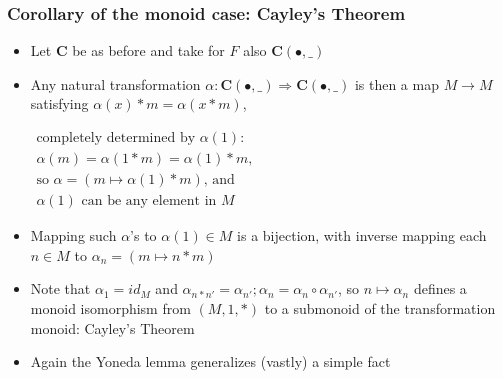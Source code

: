 \documentclass[handout]{beamer}
\newcommand{\To}{\Rightarrow}
\newcommand{\bfsf}[1]{{\boldsymbol{#1}}}
\newcommand{\CC}{\bfsf{C}}
\begin{document}
\frame
  {   
    \frametitle{Corollary of the monoid case: Cayley's Theorem}\label{Yon:MonCayley}

 \begin{itemize}[<+->]
\item Let $\CC$ be as before and take for $F$ also $\CC(\bullet,\_)$
\item Any natural transformation $\alpha: \CC(\bullet,\_)\To \CC(\bullet,\_)$ is
then a map $M\to M$ satisfying $\alpha(x)*m = \alpha(x*m)$,
$\begin{array}{l}%
\text{completely determined by $\alpha(1)$:}\\
\text{$\alpha(m) = \alpha(1*m)   = \alpha(1)*m$,}\\
\text{so $\alpha = (m\mapsto \alpha(1)*m)$, and}\\ %
\text{$\alpha(1)$ can be any element in $M$}
\end{array}$
\item Mapping such $\alpha$'s to $\alpha(1)\in M$ is a bijection, with inverse
mapping each $n\in M$ to $\alpha_n = (m\mapsto n*m)$ %
\item Note that $\alpha_1 = id_M$ and 
$\alpha_{n*n'} = \alpha_{n'};\alpha_n= \alpha_n\circ\alpha_{n'}$, so
$n\mapsto\alpha_n$ defines a monoid isomorphism  from $(M,1,*)$
to a submonoid of the transformation monoid: Cayley's Theorem
\item Again  the Yoneda lemma generalizes (vastly) a simple fact
 \end{itemize}

 }
\end{document}
